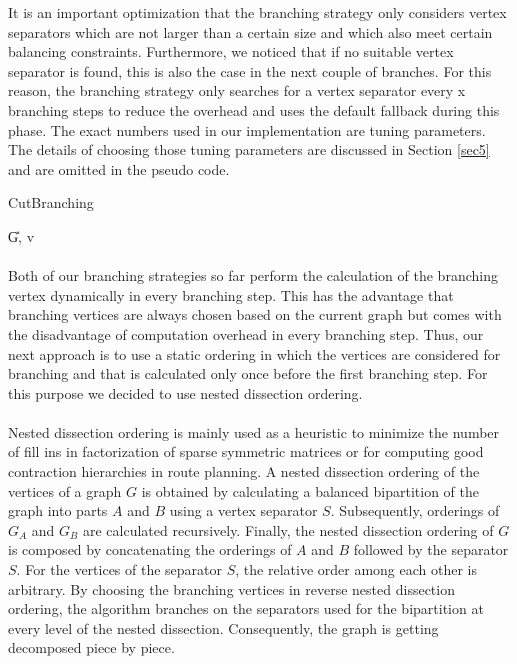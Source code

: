 \documentclass[]{article}
\begin{document}
It is an important optimization that the branching strategy only considers vertex separators which are not larger than a certain size and which also meet certain balancing constraints. Furthermore, we noticed that if no suitable vertex separator is found, this is also the case in the next couple of branches. For this reason, the branching strategy only searches for a vertex separator every x branching steps to reduce the overhead and uses the default fallback during this phase. The exact numbers used in our implementation are tuning parameters. The details of choosing those tuning parameters are discussed in Section \ref{sec5} and are omitted in the pseudo code. 

\begin{algorithm}
	\caption{CutBranching}\label{alg:cut_strat}
	\DontPrintSemicolon
	
	
	\U{G, v}	
	
	
\end{algorithm}
\paragraph{}
Both of our branching strategies so far perform the calculation of the branching vertex dynamically in every branching step. This has the advantage that branching vertices are always chosen based on the current graph but comes with the disadvantage of computation overhead in every branching step. Thus, our next approach is to use a static ordering in which the vertices are considered for branching and that is calculated only once before the first branching step. For this purpose we decided to use nested dissection ordering.

\paragraph{}
Nested dissection ordering is mainly used as a heuristic to minimize the number of fill ins in factorization of sparse symmetric matrices or for computing good contraction hierarchies in route planning.  A nested dissection ordering of the vertices of a graph $G$ is obtained by calculating a balanced bipartition of the graph into parts $A$ and $B$ using a vertex separator $S$. Subsequently, orderings of $G_A$ and $G_B$ are calculated recursively. Finally, the nested dissection ordering of $G$ is composed by concatenating the orderings of $A$ and $B$ followed by the separator $S$. For the vertices of the separator $S$, the relative order among each other is arbitrary. By choosing the branching vertices in reverse nested dissection ordering, the algorithm branches on the separators used for the bipartition at every level of the nested dissection. Consequently, the graph is getting decomposed piece by piece.
\end{document}
